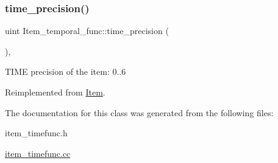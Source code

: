\mbox{\label{classItem__temporal__func_a78c81ac3504e8cc63f3743bee366f3f2}} 
\subsubsection{\texorpdfstring{time\+\_\+precision()}{time\_precision()}}
{\footnotesize\ttfamily uint Item\+\_\+temporal\+\_\+func\+::time\+\_\+precision (\begin{DoxyParamCaption}{ }\end{DoxyParamCaption})\hspace{0.3cm}{\ttfamily [inline]}, {\ttfamily [virtual]}}

T\+I\+ME precision of the item\+: 0..6 

Reimplemented from \mbox{\hyperlink{classItem_a7b3cc55ea7e3a429a6e8f0fbbba6e4ff}{Item}}.



The documentation for this class was generated from the following files\+:\begin{DoxyCompactItemize}
\item 
item\+\_\+timefunc.\+h\item 
\mbox{\hyperlink{item__timefunc_8cc}{item\+\_\+timefunc.\+cc}}\end{DoxyCompactItemize}
